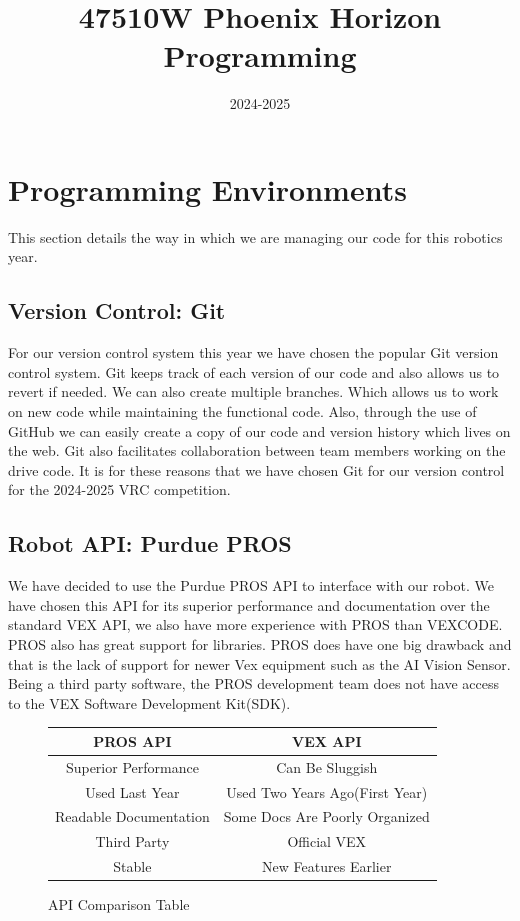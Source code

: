 \documentclass[12pt]{report}
\title{47510W Phoenix Horizon Programming}
\date{2024-2025}
\author{}
\begin{document}
 \maketitle
 \tableofcontents
 \newpage

\chapter{Programming Environments}
This section details the way in which we are managing our code for this robotics year.
\section{Version Control: Git}
For our version control system this year we have chosen the popular Git version control system.
 Git keeps track of each version of our code and also allows us to revert if needed.
 We can also create multiple branches. 
 Which allows us to work on new code while maintaining the functional code.
 Also, through the use of GitHub we can easily create a copy of our code and version history which lives on the web. 
 Git also facilitates collaboration between team members working on the drive code.
 It is for these reasons that we have chosen Git for our version control for the 2024-2025 VRC competition.
\section{Robot API: Purdue PROS}
We have decided to use the Purdue PROS API to interface with our robot.
We have chosen this API for its superior performance and documentation over the standard VEX API,
    we also have more experience with PROS than VEXCODE. 
PROS also has great support for libraries. 
PROS does have one big drawback and that is the lack of support for newer Vex equipment such as the AI Vision Sensor. 
Being a third party software, 
    the PROS development team does not have access to the VEX Software Development Kit(SDK).
\begin{figure}[h]
        \caption{API Comparison Table}
        \label{TABLE::API_COMP}
        \centering
        \begin{tabular}{c|c}
        PROS API & VEX API \\
        \hline
        Superior Performance & Can Be Sluggish \\
        Used Last Year & Used Two Years Ago(First Year) \\
        Readable Documentation & Some Docs Are Poorly Organized \\
        Third Party & Official VEX \\
        Stable & New Features Earlier \\
    \end{tabular}
\end{figure}
\end{document}
